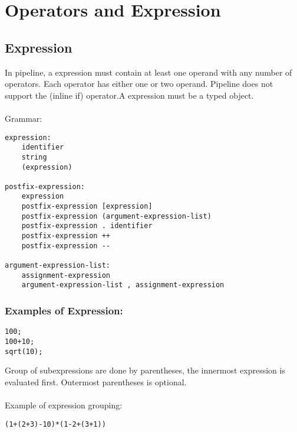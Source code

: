 \documentclass[./LRM_main.tex]{subfiles}
\begin{document}


\chapter{Operators and Expression}
\section{Expression}
In pipeline, a expression must contain at least one operand with any number of operators. Each operator has either one or two operand. Pipeline does not support the (inline if) operator.A expression must be a typed object.\\ 
\vspace{1mm}\\
Grammar:
\begin{lstlisting}
expression:
    identifier
    string
    (expression)

postfix-expression:
    expression
    postfix-expression [expression]
    postfix-expression (argument-expression-list)
    postfix-expression . identifier
    postfix-expression ++
    postfix-expression --
    
argument-expression-list:
    assignment-expression
    argument-expression-list , assignment-expression
\end{lstlisting}
\subsection{Examples of Expression:}
\begin{lstlisting}
100;
100+10;
sqrt(10);
\end{lstlisting}
\vspace{1 mm}
Group of subexpressions are done by parentheses, the innermost expression is evaluated first. Outermost parentheses is optional.\\
\vspace{1 mm}\\
Example of expression grouping:
\begin{lstlisting}
(1+(2+3)-10)*(1-2+(3+1))
\end{lstlisting}
\end{document}
